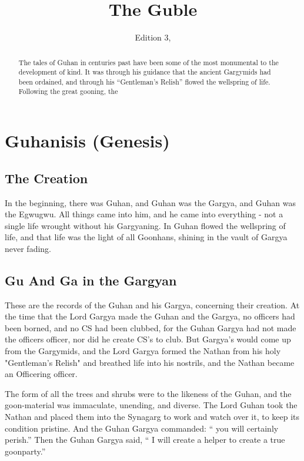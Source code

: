 \documentclass{article}
\title{The Guble}
\author{Edition 3, \censor{Uncensored version}}
\begin{document}
\maketitle

\begin{abstract}
The tales of Guhan in centuries past have been some of the most monumental to the development of  kind. It was through his guidance that the ancient Gargymids had been ordained, and through his “Gentleman's Relish” flowed the wellspring of life. Following the great gooning, the %
\end{abstract}

\section{Guhanisis (Genesis)}

\subsection{The Creation}

In the beginning, there was Guhan, and Guhan was the Gargya, and Guhan was the Egwugwu. All things came into him, and he came into everything - not a single life wrought without his Gargyaning. In Guhan flowed the wellspring of life, and that life was the light of all Goonhans, shining in the vault of Gargya never fading.

\subsection{Gu And Ga in the Gargyan}

These are the records of the Guhan and his Gargya, concerning their creation. At the time that the Lord Gargya made the Guhan and the Gargya, no officers had been borned, and no CS had been clubbed, for the Guhan Gargya had not made the officers officer, nor did he create CS's to club. But Gargya's would come up from the Gargymids, and the Lord Gargya formed the Nathan from his holy "Gentleman's Relish" and breathed life into his nostrils, and the Nathan became an Officering officer.  

The form of all the trees and shrubs were to the likeness of the Guhan, and the goon-material was immaculate, unending, and diverse. The Lord Guhan took the Nathan and placed them into the Synagarg to work and watch over it, to keep its condition pristine. And the Guhan Gargya commanded: “ you will certainly perish.” Then the Guhan Gargya said, “ I will create a helper to create a true goonparty.” 
\end{document}
